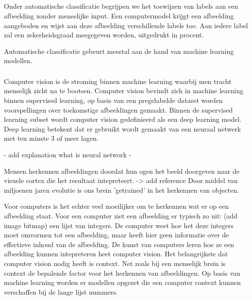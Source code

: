 \subsection{}
\label{sec:automatic-classification}
Onder automatische classificatie begrijpen we het toewijzen van labels aan een afbeelding zonder menselijke input. Een computermodel krijgt een afbeelding aangeboden en wijst aan deze afbeelding verschillende labels toe. Aan iedere label zal een zekerheidsgraad meegegeven worden, uitgedrukt in procent.

Automatische classificatie gebeurt meestal aan de hand van machine learning modellen.

\subsubsection{}
\label{sec:computer-vision}
Computer vision is de stroming binnen machine learning waarbij men tracht menselijk zicht na te bootsen. Computer vision bevindt zich in machine learning binnen supervised learning, op basis van een pregelabelde dataset worden voorspellingen over toekomstige afbeeldingen gemaakt.
Binnen de supervised learning subset wordt computer vision gedefinieerd als een deep learning model. Deep learning betekent dat er gebruikt wordt gemaakt van een neuraal netwerk met ten minste 3 of meer lagen.

- add explanation what is neural network -

Mensen herkennen afbeeldingen doordat hun ogen het beeld doorgeven naar de visuele cortex die het resultaat intepreteert. -> add reference
Door middel van miljoenen jaren evolutie is ons brein 'getrained' in het herkennen van objecten.

Voor computers is het echter veel moeilijker om te herkennen wat er op een afbeelding staat. Voor een computer ziet een afbeelding er typisch zo uit:
(add image bitmap) een lijst van integers. De computer weet hoe het deze integers moet omvormen tot een afbeelding, maar heeft hier geen informatie over de effectieve inhoud van de afbeelding.
De kunst van computers leren hoe ze een afbeelding kunnen intepreteren heet computer vision. 
Het belangrijkste dat computer vision nodig heeft is context. Net zoals bij een menselijk brein is context de bepalende factor voor het herkennen van afbeeldingen.
Op basis van machine learning worden er modellen opgezet die een computer context kunnen verschaffen bij de lange lijst nummers.

